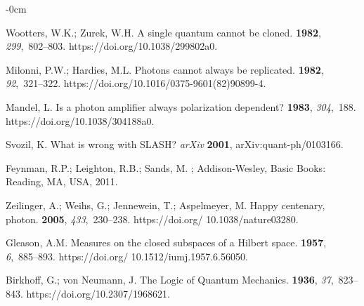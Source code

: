 \documentclass[entropy,article,accept,oneauthor,pdftex]{Definitions/mdpi}
\begin{document}
\begin{adjustwidth}{-\extralength}{0cm}
\begin{thebibliography}{999}
Wootters, W.K.; Zurek, W.H.
\newblock A single quantum cannot be cloned.
 {\bf 1982}, {\em 299},~802--803.
\newblock
  {https://doi.org/10.1038/299802a0}.

Milonni, P.W.; Hardies, M.L.
\newblock Photons cannot always be replicated.
 {\bf 1982}, {\em 92},~321--322.
\newblock
  {https://doi.org/10.1016/0375-9601(82)90899-4}.

Mandel, L.
\newblock Is a photon amplifier always polarization dependent?
 {\bf 1983}, {\em 304},~188.
\newblock
  {https://doi.org/10.1038/304188a0}.

Svozil, K.
\newblock What is wrong with {SLASH}? \emph{arXiv} \textbf{2001},  arXiv:quant-ph/0103166.

Feynman, R.P.; Leighton, R.B.; Sands, M.
; Addison-Wesley, Basic Books: Reading, MA, USA, 2011.


Zeilinger, A.; Weihs, G.; Jennewein, T.; Aspelmeyer, M.
\newblock Happy centenary, photon.
 {\bf 2005}, {\em 433},~230--238.
\newblock
  {https://doi.org/ 10.1038/nature03280}.

Gleason, A.M.
\newblock Measures on the closed subspaces of a {H}ilbert space.
 {\bf 1957}, {\em 6},~885--893.
\newblock
  {https://doi.org/ 10.1512/iumj.1957.6.56050}.

Birkhoff, G.; {von Neumann}, J.
\newblock The Logic of Quantum Mechanics.
 {\bf 1936}, {\em 37},~823--843.
\newblock
  {https://doi.org/10.2307/1968621}.



\end{thebibliography}
\end{adjustwidth}



\end{document}
